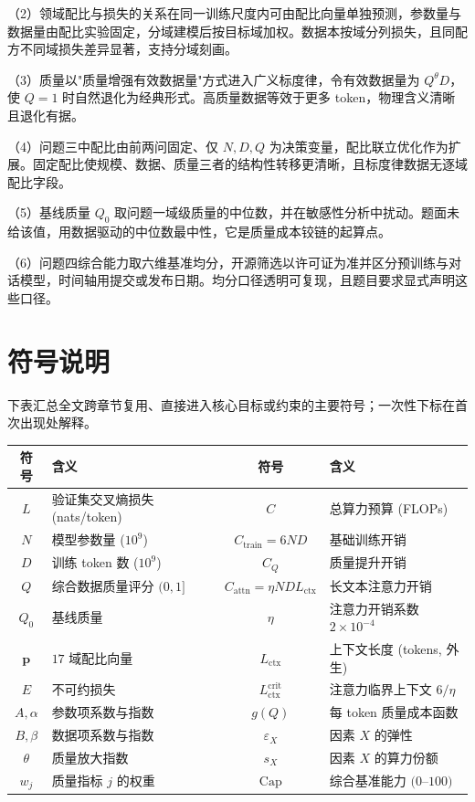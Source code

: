 \documentclass[12pt,a4paper]{ctexart}
\newcommand{\Dt}{D}
\newcommand{\Lctx}{L_{\mathrm{ctx}}}
\newcommand{\Ctrain}{C_{\mathrm{train}}}
\newcommand{\Cattn}{C_{\mathrm{attn}}}
\begin{document}
（2）领域配比与损失的关系在同一训练尺度内可由配比向量单独预测，参数量与数据量由配比实验固定，分域建模后按目标域加权。数据本按域分列损失，且同配方不同域损失差异显著，支持分域刻画。

（3）质量以"质量增强有效数据量"方式进入广义标度律，令有效数据量为 $Q^{\theta}\Dt$，使 $Q=1$ 时自然退化为经典形式。高质量数据等效于更多 token，物理含义清晰且退化有据。

（4）问题三中配比由前两问固定、仅 $N,\Dt,Q$ 为决策变量，配比联立优化作为扩展。固定配比使规模、数据、质量三者的结构性转移更清晰，且标度律数据无逐域配比字段。

（5）基线质量 $Q_0$ 取问题一域级质量的中位数，并在敏感性分析中扰动。题面未给该值，用数据驱动的中位数最中性，它是质量成本铰链的起算点。

（6）问题四综合能力取六维基准均分，开源筛选以许可证为准并区分预训练与对话模型，时间轴用提交或发布日期。均分口径透明可复现，且题目要求显式声明这些口径。

\section{符号说明}
下表汇总全文跨章节复用、直接进入核心目标或约束的主要符号；一次性下标在首次出现处解释。

\begin{table}[H]
  \centering
  \small
  \begin{tabular}{clcl}
    \toprule
    符号 & 含义 & 符号 & 含义 \\
    \midrule
    $L$ & 验证集交叉熵损失 (nats/token) & $C$ & 总算力预算 (FLOPs) \\
    $N$ & 模型参数量 ($10^9$) & $\Ctrain=6N\Dt$ & 基础训练开销 \\
    $\Dt$ & 训练 token 数 ($10^9$) & $C_Q$ & 质量提升开销 \\
    $Q$ & 综合数据质量评分 $(0,1]$ & $\Cattn=\eta N\Dt\Lctx$ & 长文本注意力开销 \\
    $Q_0$ & 基线质量 & $\eta$ & 注意力开销系数 $2\times10^{-4}$ \\
    $\bm p$ & $17$ 域配比向量 & $\Lctx$ & 上下文长度 (tokens, 外生) \\
    $E$ & 不可约损失 & $\Lctx^{\mathrm{crit}}$ & 注意力临界上下文 $6/\eta$ \\
    $A,\alpha$ & 参数项系数与指数 & $g(Q)$ & 每 token 质量成本函数 \\
    $B,\beta$ & 数据项系数与指数 & $\varepsilon_X$ & 因素 $X$ 的弹性 \\
    $\theta$ & 质量放大指数 & $s_X$ & 因素 $X$ 的算力份额 \\
    $w_j$ & 质量指标 $j$ 的权重 & $\mathrm{Cap}$ & 综合基准能力 $(0$--$100)$ \\
    \bottomrule
  \end{tabular}
\end{table}










\end{document}
